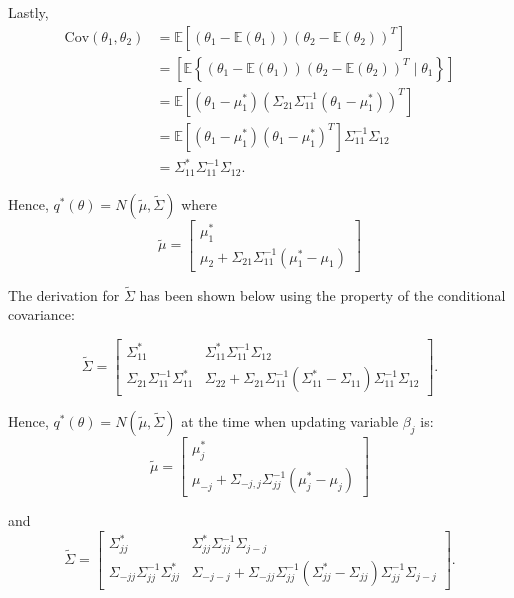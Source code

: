 \noindent Lastly,
$$
\begin{array}{rl}
	\mbox{Cov}(\theta_1,\theta_2) 
	&  = \mathbb{E}[(\theta_1 - \mathbb{E}(\theta_1))(\theta_2 - \mathbb{E}(\theta_2))^T] 
	\\ [2ex]
	&  = \left[ \mathbb{E}\left\{ (\theta_1 - \mathbb{E}(\theta_1))(\theta_2 - \mathbb{E}(\theta_2))^T \mid \theta_1 \right\} \right]     \\ [2ex]
	& = \mathbb{E}\left[ \left(\theta_1 - \mu_1^* \right)\left(  \Sigma_{21}\Sigma_{11}^{-1}(\theta_1 - \mu_1^*)    \right)^T\right] 
	\\ [2ex]
	&  = \mathbb{E}\left[ \left(\theta_1 - \mu_1^* \right)\left(  \theta_1 - \mu_1^* \right)^T\right] \Sigma_{11}^{-1}\Sigma_{12}
	\\ [2ex]
	&  = \Sigma_{11}^* \Sigma_{11}^{-1}\Sigma_{12}.
\end{array} 
$$

\noindent Hence, $q^*(\theta) = N(\widetilde{\mu},\widetilde{\Sigma})$ where
$$
\widetilde{\mu} =
\left[ \begin{array}{c}
	\mu_1^* \\
	\mu_2 + \Sigma_{21}\Sigma_{11}^{-1}\left(\mu_1^* - \mu_1\right)
\end{array} \right]
$$

The derivation for $\tilde{\Sigma}$ has been shown below using the property of the conditional covariance:

$$
\widetilde{\Sigma} = 
\left[ \begin{array}{cc}
	\Sigma_{11}^* & \Sigma_{11}^* \Sigma_{11}^{-1}\Sigma_{12} \\
	\Sigma_{21}  \Sigma_{11}^{-1}\Sigma_{11}^* & \Sigma_{22} 
	+ \Sigma_{21}\Sigma_{11}^{-1}  ( \Sigma_{11}^* -\Sigma_{11})  \Sigma_{11}^{-1} \Sigma_{12}
\end{array} \right].
$$




\noindent Hence, $q^*(\theta) = N(\widetilde{\mu},\widetilde{\Sigma})$ at the time when updating variable $\beta_j$ is:
\begin{equation}
	\widetilde{\mu} =
	\left[ \begin{array}{c}
		\mu_j^* \\
		\mu_{-j} + \Sigma_{-j,j}\Sigma_{jj}^{-1}\left(\mu_j^* - \mu_j\right)
	\end{array} \right]
\end{equation}

\noindent and
\begin{equation}
	\widetilde{\Sigma} = 
	\left[ \begin{array}{cc}
		\Sigma_{jj}^* & \Sigma_{jj}^* \Sigma_{jj}^{-1}\Sigma_{j-j} \\
		\Sigma_{-jj}  \Sigma_{jj}^{-1}\Sigma_{jj}^* & \Sigma_{-j-j} 
		+ \Sigma_{-jj}\Sigma_{jj}^{-1}  ( \Sigma_{jj}^* -\Sigma_{jj})  \Sigma_{jj}^{-1} \Sigma_{j-j}
	\end{array} \right].
\end{equation}


